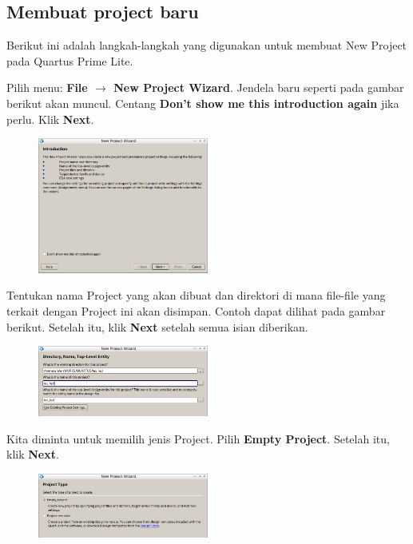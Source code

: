 \subsection{Membuat project baru}
Berikut ini adalah langkah-langkah yang digunakan untuk membuat New Project
pada Quartus Prime Lite.

Pilih menu: \textbf{File $\rightarrow$ New Project Wizard}.
Jendela baru seperti pada gambar berikut akan
muncul.
Centang \textbf{Don't show me this introduction again} jika perlu.
Klik \textbf{Next}.
\begin{figure}[H]
\centering
\includegraphics[width=0.5\textwidth]{images/NewProjectWizard_1.png}
\par
\end{figure}


Tentukan nama Project yang akan dibuat dan direktori di
mana file-file yang terkait dengan Project ini akan disimpan. Contoh
dapat dilihat pada gambar berikut. Setelah itu, klik \textbf{Next}
setelah semua isian diberikan.

\begin{figure}[H]
\centering
\includegraphics[width=0.5\textwidth]{images/NewProjectWizard_2.png}
\par
\end{figure}


Kita diminta untuk memilih jenis Project. Pilih \textbf{Empty Project}.
Setelah itu, klik \textbf{Next}.

\begin{figure}[H]
\centering
\includegraphics[width=0.5\textwidth]{images/NewProjectWizard_3.png}
\par
\end{figure}


